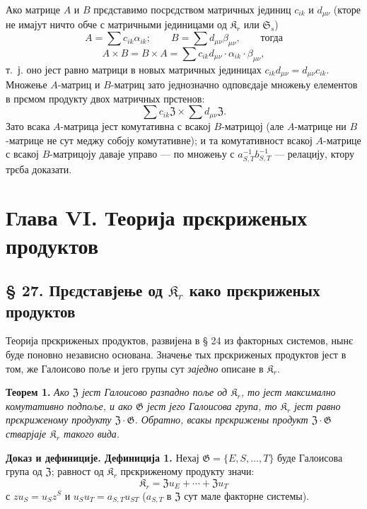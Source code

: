 \documentclass[11pt]{article}
\begin{document}
Ако матрице \(A\) и \(B\) прєдставимо посрєдством матричных јединиц \(c_{ik}\) и \(d_{\mu\nu}\) (кторе не имајут ничто обче с матричными јединицами од \(\mathfrak K_r\) или \(\mathfrak S_s\))
\[
A=\sum c_{ik}\alpha_{ik};\qquad
B=\sum d_{\mu\nu}\beta_{\mu\nu},\qquad\text{тогда}
\]
\[
A\times B=B\times A
=\sum c_{ik}d_{\mu\nu}\cdot\alpha_{ik}\cdot\beta_{\mu\nu},
\]
т.~ј. оно јест равно матрици в новых матричных јединицах
\(c_{ik}d_{\mu\nu}=d_{\mu\nu}c_{ik}\). Множење \(A\)-матриц и \(B\)-матриц зато једнозначно одповєдаје множењу елементов в прємом продукту двох матричных прстенов:
\[
\sum c_{ik}\mathfrak Z\times\sum d_{\mu\nu}\mathfrak Z.
\]
Зато всака \(A\)-матрица јест комутативна с всакој \(B\)-матрицој (але \(A\)-матрице ни \(B\)-матрице не сут меджу собоју комутативне); и та комутативност всакој \(A\)-матрице с всакој \(B\)-матрицоју даваје управо --- по множењу с \(a_{S,T}^{-1}b_{S,T}^{-1}\) --- релацију, ктору трєба доказати.

\section*{Глава VI. Теорија прєкриженых продуктов}\label{kapitel-vi.-theorie-der-verschraenkten-produkte}

\subsection*{§ 27. Прєдставјење од \(\mathfrak K_r\) како прєкриженых продуктов}

Теорија прєкриженых продуктов, развијена в § 24 из факторных системов, нынє буде поновно независно основана. Значење тых прєкриженых продуктов јест в том, же Галоисово поље и јего групы сут \emph{заједно} описане в \(\mathfrak K_r\).

\noindent\textbf{Теорем 1.} \emph{Ако \(\mathfrak Z\) јест Галоисово разпадно поље од \(\mathfrak K_r\), то јест максимално комутативно подпоље, и ако \(\mathfrak G\) јест јего Галоисова група, то \(\mathfrak K_r\) јест равно прєкриженому продукту \(\mathfrak Z\cdot\mathfrak G\). Обратно, всакы прєкрижены продукт \(\mathfrak Z\cdot\mathfrak G\) стварјаје \(\mathfrak K_r\) такого вида.}

\noindent\textbf{Доказ и дефиниције. Дефиниција 1.} Нехај \(\mathfrak G=\{E,S,\ldots,T\}\) буде Галоисова група од \(\mathfrak Z\); равност од \(\mathfrak K_r\) прєкриженому продукту значи:
\[
\mathfrak K_r=\mathfrak Zu_E+\cdots+\mathfrak Zu_T
\]
с \(zu_S=u_Sz^S\) и \(u_Su_T=a_{S,T}u_{ST}\) (\(a_{S,T}\) в \(\mathfrak Z\) сут мале факторне системы).
\end{document}
